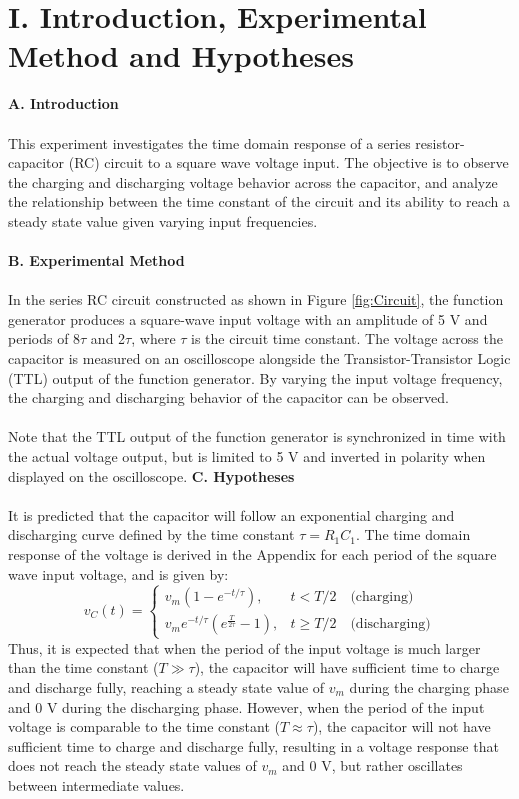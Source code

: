 \documentclass[12pt]{article}
\begin{document}
\section*{I. Introduction, Experimental Method and Hypotheses}
\textbf{A. Introduction}\\\\
This experiment investigates the time domain response of a series resistor-capacitor (RC) circuit to a square wave voltage input. The objective is to observe the charging and discharging voltage behavior across the capacitor, and analyze the relationship between the time constant of the circuit and its ability to reach a steady state value given varying input frequencies.\\\\
\textbf{B. Experimental Method}\\\\
In the series RC circuit constructed as shown in Figure \ref{fig:Circuit}, the function generator produces a square-wave input voltage with an amplitude of 5 V and periods of 8$\tau$ and 2$\tau$, where $\tau$ is the circuit time constant. The voltage across the capacitor is measured on an oscilloscope alongside the Transistor-Transistor Logic (TTL) output of the function generator. By varying the input voltage frequency, the charging and discharging behavior of the capacitor can be observed.\\\\
Note that the TTL output of the function generator is synchronized in time with the actual voltage output, but is limited to 5 V and inverted in polarity when displayed on the oscilloscope.
\newpage\noindent
\textbf{C. Hypotheses}\\\\
It is predicted that the capacitor will follow an exponential charging and discharging curve defined by the time constant $\tau = R_1C_1$. The time domain response of the voltage is derived in the Appendix for each period of the square wave input voltage, and is given by:
\[\boxed{v_C(t) =
\begin{cases}
v_m\left(1 - e^{-t/\tau}\right), & t < T/2 \quad \text{(charging)}\\
v_me^{-t/\tau}\left(e^{\frac{T}{2\tau}}-1\right), & t \ge T/2\quad \text{(discharging)}
\end{cases}}\]
Thus, it is expected that when the period of the input voltage is much larger than the time constant ($T \gg \tau$), the capacitor will have sufficient time to charge and discharge fully, reaching a steady state value of $v_m$ during the charging phase and 0 V during the discharging phase. However, when the period of the input voltage is comparable to the time constant ($T \approx \tau$), the capacitor will not have sufficient time to charge and discharge fully, resulting in a voltage response that does not reach the steady state values of $v_m$ and 0 V, but rather oscillates between intermediate values.\\\\
\end{document}
